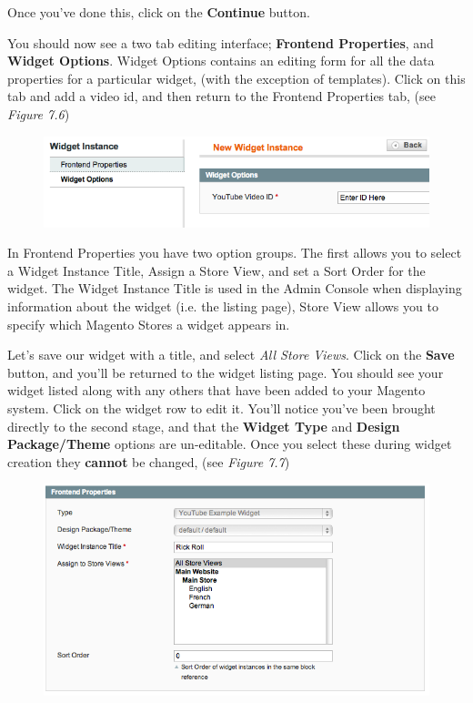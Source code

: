 \documentclass[oneside]{book}
\begin{document}
Once you've done this, click on the \textbf{Continue} button.

You should now see a two tab editing interface; \textbf{Frontend Properties}, and \textbf{Widget Options}.    Widget Options contains an editing form for all the data properties for a particular widget, (with the exception of templates).  Click on this tab and add a video id, and then return to the Frontend Properties tab, (see \emph{Figure 7.6})

\begin{figure}[htb]
\begin{center}
\leavevmode
\includegraphics[width=1\textwidth]{images/chapter7/instance-set-data.png}
\end{center}
\caption{}
\end{figure}


In Frontend Properties you have two option groups.  The first allows you to select a Widget Instance Title, Assign a Store View, and set a Sort Order for the widget.  The Widget Instance Title is used in the Admin Console when displaying information about the widget (i.e. the listing page), Store View allows you to specify which Magento Stores a widget appears in.

Let's save our widget with a title, and select \emph{All Store Views}.  Click on the \textbf{Save} button, and you'll be returned to the widget listing page.  You should see your widget listed along with any others that have been added to your Magento system.  Click on the widget row to edit it.  You'll notice you've been brought directly to the second stage, and that the \textbf{Widget Type} and \textbf{Design Package/Theme} options are un-editable. Once you select these during widget creation they \textbf{cannot} be changed, (see \emph{Figure 7.7})

\begin{figure}[htb]
\begin{center}
\leavevmode
\includegraphics[width=1\textwidth]{images/chapter7/instance-step2-always.png}
\end{center}
\caption{}
\end{figure}
\end{document}
